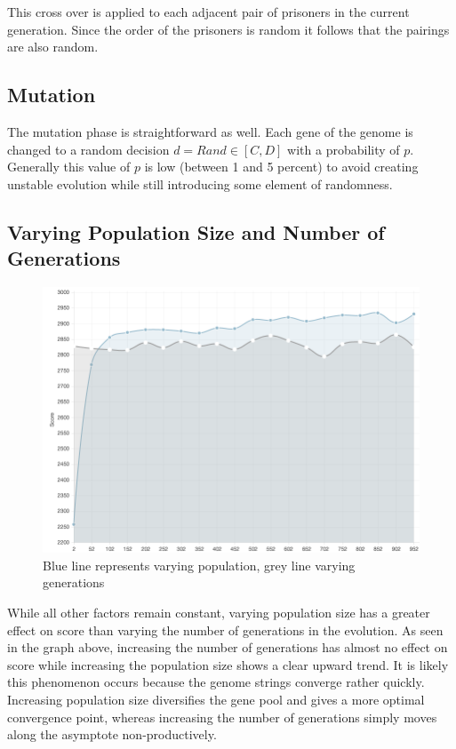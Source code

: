 \documentclass[12pt]{article}
\begin{document}
This cross over is applied to each adjacent pair of prisoners in the current
generation.  Since the order of the prisoners is random it follows that the pairings
are also random.

\subsection{Mutation}
\label{mutation}

The mutation phase is straightforward as well.  Each gene of the genome is changed
to a random decision $d = Rand \in [C, D]$ with a probability of $p$.  Generally
this value of $p$ is low (between 1 and 5 percent) to avoid creating unstable
evolution while still introducing some element of randomness.

\pagebreak

\subsection{Varying Population Size and Number of Generations}
\label{vpg}
\begin{figure}[h!]
    \centering
    \includegraphics[scale=0.5]{figures/gen_pop_compare}
    \caption{Blue line represents varying population, grey line varying generations}
\end{figure}

While all other factors remain constant,
varying population size has a greater effect on score than varying the number
of generations in the evolution. As seen in the graph above, increasing the number
of generations has almost no effect on score while increasing the population
size shows a clear upward trend.  It is likely this phenomenon occurs because the genome
strings converge rather quickly.  Increasing population size diversifies
the gene pool and gives a more optimal convergence point, whereas increasing
the number of generations simply moves along the asymptote non-productively.
\end{document}
